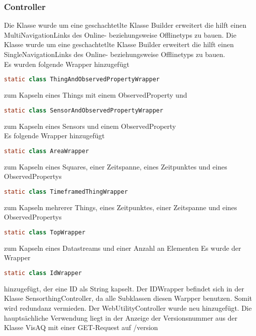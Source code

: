 \subsubsection{Controller}
\noChange
{}
Die Klasse wurde um eine geschachtetlte Klasse Builder erweitert die hilft einen MultiNavigationLinks des Online- beziehungsweise Offlinetyps zu bauen.
\noChange
{}
\noChange
{}
\noChange
{}
Die Klasse wurde um eine geschachtetlte Klasse Builder erweitert die hilft einen SingleNavigationLinks des Online- beziehungsweise Offlinetyps zu bauen.
\noChange
\controllerWrapper
\\
Es wurden folgende Wrapper hinzugefügt
\begin{lstlisting}[language=java]
    static class ThingAndObservedPropertyWrapper
\end{lstlisting}
zum Kapseln eines Things mit einem ObservedProperty
und 
\begin{lstlisting}[language=java]
    static class SensorAndObservedPropertyWrapper
\end{lstlisting}
zum Kapseln eines Sensors und einem ObservedProperty
\controllerWrapper
{}
\controllerWrapper
{}
\controllerWrapper
{}
\controllerWrapper
\\
Es folgende Wrapper hinzugefügt
\begin{lstlisting}[language=java]
    static class AreaWrapper
\end{lstlisting}
zum Kapseln eines Squares, einer Zeitspanne, eines Zeitpunktes und eines ObservedPropertys
\begin{lstlisting}[language=java]
    static class TimeframedThingWrapper
\end{lstlisting}
zum Kapseln mehrerer Things, eines Zeitpunktes, einer Zeitspanne und eines ObservedPropertys
\begin{lstlisting}[language=java]
    static class TopWrapper
\end{lstlisting}
zum Kapseln eines Datastreams und einer Anzahl an Elementen
\controllerWrapper
{}
\controllerWrapper
{}
Es wurde der Wrapper
\begin{lstlisting}[language=java]
    static class IdWrapper
\end{lstlisting}
hinzugefügt, der eine ID als String kapselt.
Der IDWrapper befindet sich in der Klasse SensorthingController, da alle Subklassen diesen Warpper benutzen.
Somit wird redundanz vermieden.
\controllerWrapper
{}
\controllerWrapper
{}
Der WebUtilityController wurde neu hinzugefügt. Die hauptsächliche Verwendung liegt in der Anzeige der Versionsnummer aus der Klasse VisAQ mit einer GET-Request auf /version

